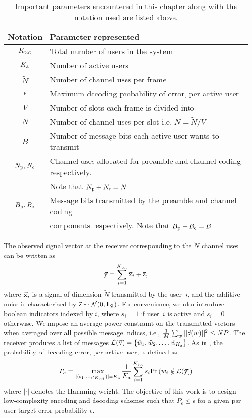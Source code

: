 \begin{table}[!ht]
\centering
\begin{tabular}{|c|l|}
\hline
Notation & Parameter represented\\
\hline
$K_{\text{tot}}$ & Total number of users in the system\\
$K_{\text{a}}$ & Number of active users\\
$\tilde{N}$ &  Number of channel uses per frame\\
$\epsilon$ & Maximum decoding probability of error, per active user\\
$V$ & Number of slots each frame is divided into\\
$N$ & Number of channel uses per slot i.e. $N=\tilde{N}/V$\\
$B$ & Number of message bits each active user wants to transmit\\
$N_{\mathrm{p}},N_{\mathrm{c}}$ & Channel uses allocated for preamble and channel coding respectively.\\
		& Note that  $N_{\mathrm{p}}+N_{\mathrm{c}}=N$ \\
$B_{\mathrm{p}},B_{\mathrm{c}}$ & Message bits transmitted by the preamble and channel coding \\
       & components respectively. Note that $B_{\mathrm{p}}+B_{\mathrm{c}}=B$\\
\hline
\end{tabular}
\caption{Important parameters encountered in this chapter along with the notation used are listed above.}
\label{table:notaiton}
\end{table}

The observed signal vector at the receiver corresponding to the $\tilde{N}$ channel uses can be written as
\begin{equation}
\vec{\mathrm{y}} = \sum_{i=1}^{K_{\text{tot}}} \vec{\mathrm{x}}_{i} + \vec{\mathrm{z}},
\end{equation}
where $\vec{\mathrm{x}}_i$ is a signal of dimension $\tilde{N}$ transmitted by the user~$i$, and the additive noise is characterized by $\vec{\mathrm{z}} \sim \mathcal{N}(0,\mathbf{I}_{\tilde{N}})$. For convenience, we also introduce boolean indicators indexed by $i$, where $s_i =1$ if user~$i$ is active and $s_i = 0$ otherwise. We impose an average power constraint on the transmitted vectors when averaged over all possible message indices, i.e., $\frac{1}{M}\sum_{w} ||\vec{\mathrm{x}}(w)||^2\leq \tilde{N}P$.  The receiver produces a list of messages $\mathcal{L}(\vec{\mathrm{y}}) = \{\hat{w}_1,\hat{w}_2,\ldots,\hat{w}_{K_{\text{a}}} \}$. As in \cite{ordentlich2017low}, the probability of decoding error, per active user, is defined as
\begin{equation}\label{eqn:proboferrordefinition}
  P_e = \max_{|(s_1,\ldots,s_{K_{\text{tot}}})| = K_{\text{a}}} \frac{1}{K_{\text{a}}} \sum_{i=1}^{K_{\text{tot}}} s_i \mathrm{Pr}\left( w_i \notin \mathcal{L}(\vec{\mathrm{y}}) \right)
\end{equation}
where $|\cdot|$ denotes the Hamming weight. The objective of this work is to design low-complexity encoding and decoding schemes such that $P_e \leq \epsilon$ for a given per user target error probability $\epsilon$.

